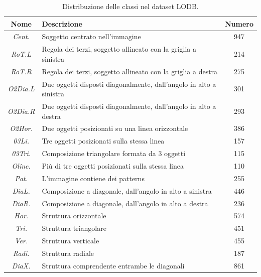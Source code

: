 \begin{table}[ht]
    \centering
    \setlength{\tabcolsep}{4pt} %
    \renewcommand{\arraystretch}{1.6} %
    \begin{tabular}{c|m{8cm}|c}
        \hline
        \textbf{Nome} & \textbf{Descrizione} & \textbf{Numero} \\
        \hline
        \hline
        \textit{Cent.} & Soggetto centrato nell'immagine & 947 \\
        \hline
        \textit{RoT.L} & Regola dei terzi, soggetto allineato con la griglia a sinistra & 214 \\
        \hline
        \textit{RoT.R} & Regola dei terzi, soggetto allineato con la griglia a destra & 275 \\
        \hline
        \textit{O2Dia.L} & Due oggetti disposti diagonalmente, dall'angolo in alto a sinistra & 301 \\
        \hline
        \textit{O2Dia.R} & Due oggetti disposti diagonalmente, dall'angolo in alto a destra & 293 \\
        \hline
        \textit{O2Hor.} & Due oggetti posizionati su una linea orizzontale & 386 \\
        \hline
        \textit{03Li.} & Tre oggetti posizionati sulla stessa linea & 157 \\
        \hline
        \textit{03Tri.} & Composizione triangolare formata da 3 oggetti & 115 \\
        \hline
        \textit{Oline.} & Più di tre oggetti posizionati sulla stessa linea & 110 \\
        \hline
        \textit{Pat.} & L'immagine contiene dei patterns & 255 \\
        \hline
        \textit{DiaL.} & Composizione a diagonale, dall'angolo in alto a sinistra & 446 \\
        \hline
        \textit{DiaR.} & Composizione a diagonale, dall'angolo in alto a destra & 236 \\
        \hline
        \textit{Hor.} & Struttura orizzontale & 574 \\
        \hline
        \textit{Tri.} & Struttura triangolare & 451 \\
        \hline
        \textit{Ver.} & Struttura verticale & 455 \\
        \hline
        \textit{Radi.} & Struttura radiale & 187 \\
        \hline
        \textit{DiaX.} & Struttura comprendente entrambe le diagonali & 861 \\
        \hline
    \end{tabular}
    
    \caption{Distribuzione delle classi nel dataset LODB.}
    \label{tab:lodb_comp}
    
\end{table}

